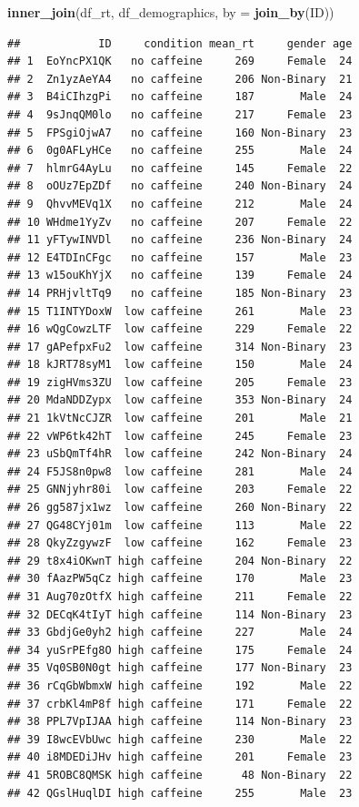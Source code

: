 \documentclass[
]{book}
\newenvironment{Shaded}{\begin{snugshade}}{\end{snugshade}}
\newcommand{\AttributeTok}[1]{\textcolor[rgb]{0.13,0.29,0.53}{#1}}
\newcommand{\FunctionTok}[1]{\textcolor[rgb]{0.13,0.29,0.53}{\textbf{#1}}}
\newcommand{\NormalTok}[1]{#1}
\begin{document}
\begin{Shaded}
\begin{Highlighting}[]
\FunctionTok{inner\_join}\NormalTok{(df\_rt, df\_demographics, }\AttributeTok{by =} \FunctionTok{join\_by}\NormalTok{(ID))}
\end{Highlighting}
\end{Shaded}

\begin{verbatim}
##            ID     condition mean_rt     gender age
## 1  EoYncPX1QK   no caffeine     269     Female  24
## 2  Zn1yzAeYA4   no caffeine     206 Non-Binary  21
## 3  B4iCIhzgPi   no caffeine     187       Male  24
## 4  9sJnqQM0lo   no caffeine     217     Female  23
## 5  FPSgiOjwA7   no caffeine     160 Non-Binary  23
## 6  0g0AFLyHCe   no caffeine     255       Male  24
## 7  hlmrG4AyLu   no caffeine     145     Female  22
## 8  oOUz7EpZDf   no caffeine     240 Non-Binary  24
## 9  QhvvMEVq1X   no caffeine     212       Male  24
## 10 WHdme1YyZv   no caffeine     207     Female  22
## 11 yFTywINVDl   no caffeine     236 Non-Binary  24
## 12 E4TDInCFgc   no caffeine     157       Male  23
## 13 w15ouKhYjX   no caffeine     139     Female  24
## 14 PRHjvltTq9   no caffeine     185 Non-Binary  23
## 15 T1INTYDoxW  low caffeine     261       Male  23
## 16 wQgCowzLTF  low caffeine     229     Female  22
## 17 gAPefpxFu2  low caffeine     314 Non-Binary  23
## 18 kJRT78syM1  low caffeine     150       Male  24
## 19 zigHVms3ZU  low caffeine     205     Female  23
## 20 MdaNDDZypx  low caffeine     353 Non-Binary  24
## 21 1kVtNcCJZR  low caffeine     201       Male  21
## 22 vWP6tk42hT  low caffeine     245     Female  23
## 23 uSbQmTf4hR  low caffeine     242 Non-Binary  24
## 24 F5JS8n0pw8  low caffeine     281       Male  24
## 25 GNNjyhr80i  low caffeine     203     Female  22
## 26 gg587jx1wz  low caffeine     260 Non-Binary  22
## 27 QG48CYj01m  low caffeine     113       Male  22
## 28 QkyZzgywzF  low caffeine     162     Female  23
## 29 t8x4iOKwnT high caffeine     204 Non-Binary  22
## 30 fAazPW5qCz high caffeine     170       Male  23
## 31 Aug70zOtfX high caffeine     211     Female  22
## 32 DECqK4tIyT high caffeine     114 Non-Binary  23
## 33 GbdjGe0yh2 high caffeine     227       Male  24
## 34 yuSrPEfg8O high caffeine     175     Female  24
## 35 Vq0SB0N0gt high caffeine     177 Non-Binary  23
## 36 rCqGbWbmxW high caffeine     192       Male  22
## 37 crbKl4mP8f high caffeine     171     Female  22
## 38 PPL7VpIJAA high caffeine     114 Non-Binary  23
## 39 I8wcEVbUwc high caffeine     230       Male  22
## 40 i8MDEDiJHv high caffeine     201     Female  23
## 41 5ROBC8QMSK high caffeine      48 Non-Binary  22
## 42 QGslHuqlDI high caffeine     255       Male  23
\end{verbatim}
\end{document}
